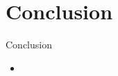 \documentclass[xcolor=table]{beamer}
\begin{document}
%
%


%


\section{Conclusion}

\begin{frame}{Conclusion}
	\begin{itemize}
		\item 
	\end{itemize}
\end{frame}
\end{document}
